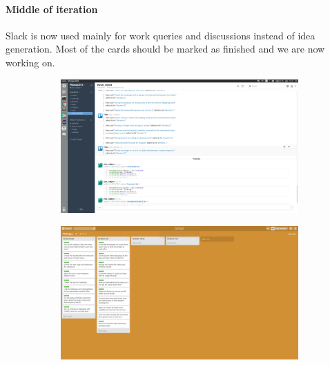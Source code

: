 \documentclass[a4wide, 10pt]{article}
\begin{document}
\vspace{-0.3cm}
\paragraph{Middle of iteration} 
Slack is now used mainly for work queries and discussions instead of idea generation.  Most of the cards should be marked as finished and we are now working on.
\begin{figure}[h]
\centering
\begin{subfigure}{.5\textwidth}
  \centering
  	\includegraphics[scale=0.1]{slackmiddle.png} 
  \label{fig:sub1}
\end{subfigure}%
\begin{subfigure}{.5\textwidth}
  \centering
  	\includegraphics[scale=0.1]{iterationmiddle.png} 
  \label{fig:sub2}
\end{subfigure}
\label{fig:test}
\end{figure}
\vspace*{-\baselineskip} 

\vspace{-0.3cm}
\end{document}
